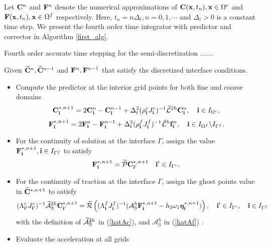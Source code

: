 Let ${\bf C}^{n}$ and ${\bf F}^{n}$ denote the numerical approximations of ${\bf C}({\bf x},t_n), {\bf x}\in\Omega^c$ and ${\bf F}({\bf x},t_n), {\bf x}\in\Omega^f$ respectively. Here, $t_n = n\Delta_t, n = 0,1,\cdots$ and $\Delta_t > 0$ is a constant time step. We present the fourth order time integrator with predictor and corrector in  Algorithm \ref{first_alg}.
~\\
\begin{breakablealgorithm}
	\caption{Fourth order accurate time stepping for the semi-discretization .......}\label{first_alg}
	Given  $\widetilde{{\bf C}}^{n}, \widetilde{{\bf C}}^{n-1}$ and ${\bf F}^{n}, {\bf F}^{n-1}$ that satisfy the discretized interface conditions.
	
	\begin{itemize}
		\item  {Compute the predictor at the interior grid points for both fine and coarse domains
			\[{\bf C}^{*,n+1}_{\bf i} = 2{\bf C}^{n}_{\bf i} - {\bf C}^{n-1}_{\bf i} + \Delta_t^2(\rho^{c}_{\bf i}J^c_{\bf i})^{-1}{\widetilde{\mathcal{L}}}^{2h} {\bf{C}}^{n}_{\bf i},\quad {\bf i}\in I_{\Omega^c},\]
			\[{\bf F}^{*,n+1}_{\bf i} = 2{\bf F}^{n}_{\bf i} - {\bf F}^{n-1}_{\bf i} + \Delta_t^2(\rho^f_{\bf i}J^f_{\bf i})^{-1}\hat{\mathcal{L}}^{h} {\bf{f}}^{n}_{\bf i},\quad {\bf i}\in I_{\Omega^f}\backslash I_{\Gamma^f}.\]
		}
		\item{For the continuity of solution at the interface $\Gamma$, assign the value ${\bf F}^{*,n+1}_{\bf i}, {\bf i}\in I_{\Gamma^f}$ to satisfy
			\begin{equation*}
			{\bf F}^{*,n+1}_{\bf i} = \widetilde{\mathcal{P}}{\bf C}^{*,n+1}_{{\bf i}'} \quad {\bf i}'\in I_{\Gamma^c}.
			\end{equation*}
		}
		\item{For the continuity of traction at the interface $\Gamma$, assign the ghost points value in $\widetilde{\bf C}^{*,n+1}$ to satisfy
			\begin{equation}\label{traction_gamma_pre}
			({\Lambda}^{c}_{{\bf i}'}{J}_{{\bf i}'}^{c})^{-1}\wt{\mathcal{A}}_3^{2h}{\bf C}^{*,n+1}_{{\bf i}'}
			= \wt{\mathcal{R}}\left(({\Lambda}^{f}_{\bf i}{J}^f_{\bf i})^{-1}(\mathcal{A}_3^h{\bf F}^{*,n+1}_{\bf i}-h_3\omega_1{\bm \eta}^{\ast,n+1}_{\bf i})\right),\quad {\bf i}'\in I_{\Gamma^c},\quad {\bf i}\in I_{\Gamma^f}
			\end{equation}
			with the definition of $\widetilde{\mathcal{A}}_3^{2h}$ in (\ref{hatAc}), and $\mathcal{A}_3^h$ in (\ref{hatAf}) .
		}
		\item{Evaluate the acceleration at all grids 
}
\end{itemize}
\end{breakablealgorithm}
